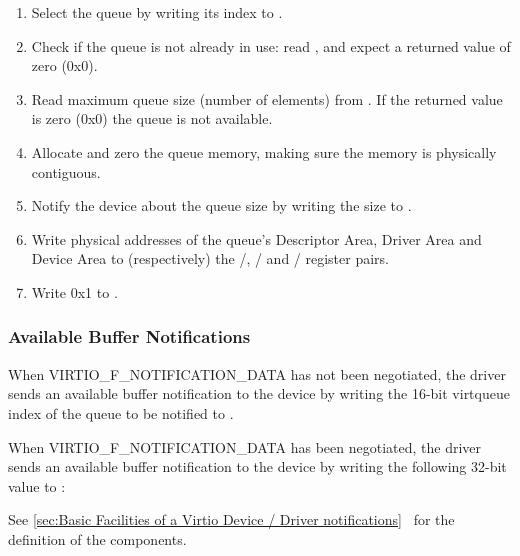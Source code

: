 \begin{enumerate}
\item Select the queue by writing its index to .

\item Check if the queue is not already in use: read ,
   and expect a returned value of zero (0x0).

\item Read maximum queue size (number of elements) from
   . If the returned value is zero (0x0) the
   queue is not available.

\item Allocate and zero the queue memory, making sure the memory
   is physically contiguous.

\item Notify the device about the queue size by writing the size to
   .

\item Write physical addresses of the queue's Descriptor Area,
   Driver Area and Device Area to (respectively) the
   /,
   / and
   / register pairs.

\item Write 0x1 to .
\end{enumerate}

\subsubsection{Available Buffer Notifications}\label{sec:Virtio Transport Options / Virtio Over MMIO / MMIO-specific Initialization And Device Operation / Available Buffer Notifications}

When VIRTIO_F_NOTIFICATION_DATA has not been negotiated,
the driver sends an available buffer notification to the device by writing
the 16-bit virtqueue index
of the queue to be notified to .

When VIRTIO_F_NOTIFICATION_DATA has been negotiated,
the driver sends an available buffer notification to the device by writing
the following 32-bit value to :


See \ref{sec:Basic Facilities of a Virtio Device / Driver notifications}~
for the definition of the components.

